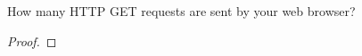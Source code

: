 \documentclass[../../main.tex]{subfiles}
\begin{document}
\begin{wts}
How many HTTP GET requests are sent by your web browser? 
\end{wts}
\begin{proof}

\end{proof}
\end{document}

